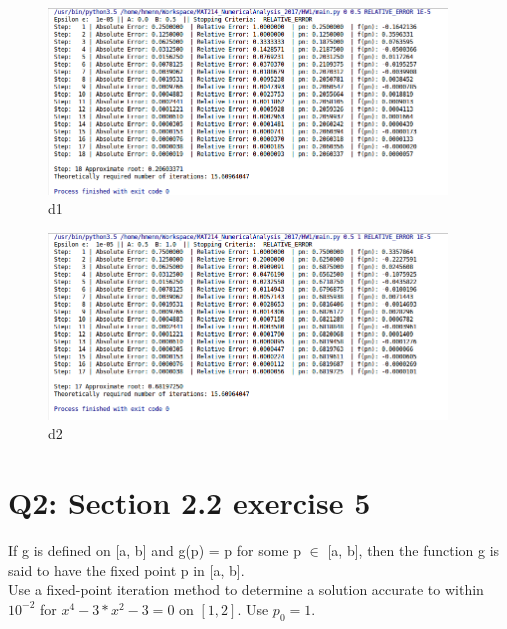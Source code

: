\documentclass{article}
\begin{document}
\newpage
\begin{figure}[h]
       \includegraphics[width=400px]{ss_2_2_6_d_1.png}
       \caption{d1}
\end{figure}
\begin{figure}[h]
       \includegraphics[width=400px]{ss_2_2_6_d_2.png}
       \caption{d2}
\end{figure}
\newpage
\section{Q2: Section 2.2 exercise 5}
If g is defined on [a, b] and g(p) = p for some p $\in$ [a, b], then the function g is said to have the fixed point p in [a, b].\\

Use a fixed-point iteration method to determine a solution accurate to within $10^{-2}$ for $x^4-3*x^2-3 = 0$ on $[1, 2]$. Use $p_0 = 1$.
\end{document}
